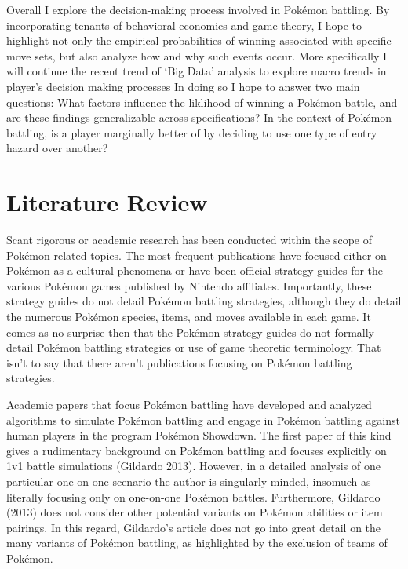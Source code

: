\documentclass[12pt,twoside]{reedthesis}
\begin{document}
  Overall I explore the decision-making process involved in Pokémon
  battling. By incorporating tenants of behavioral economics and game
  theory, I hope to highlight not only the empirical probabilities of
  winning associated with specific move sets, but also analyze how and why
  such events occur. More specifically I will continue the recent trend of
  `Big Data' analysis to explore macro trends in player's decision making
  processes In doing so I hope to answer two main questions: What factors
  influence the liklihood of winning a Pokémon battle, and are these
  findings generalizable across specifications? In the context of Pokémon
  battling, is a player marginally better of by deciding to use one type
  of entry hazard over another?
  
  \section{Literature Review}\label{literature-review}
  
  Scant rigorous or academic research has been conducted within the scope
  of Pokémon-related topics. The most frequent publications have focused
  either on Pokémon as a cultural phenomena or have been official strategy
  guides for the various Pokémon games published by Nintendo affiliates.
  Importantly, these strategy guides do not detail Pokémon battling
  strategies, although they do detail the numerous Pokémon species, items,
  and moves available in each game. It comes as no surprise then that the
  Pokémon strategy guides do not formally detail Pokémon battling
  strategies or use of game theoretic terminology. That isn't to say that
  there aren't publications focusing on Pokémon battling strategies.
  
  Academic papers that focus Pokémon battling have developed and analyzed
  algorithms to simulate Pokémon battling and engage in Pokémon battling
  against human players in the program Pokémon Showdown. The first paper
  of this kind gives a rudimentary background on Pokémon battling and
  focuses explicitly on 1v1 battle simulations (Gildardo 2013). However,
  in a detailed analysis of one particular one-on-one scenario the author
  is singularly-minded, insomuch as literally focusing only on one-on-one
  Pokémon battles. Furthermore, Gildardo (2013) does not consider other
  potential variants on Pokémon abilities or item pairings. In this
  regard, Gildardo's article does not go into great detail on the many
  variants of Pokémon battling, as highlighted by the exclusion of teams
  of Pokémon.
  
\end{document}

